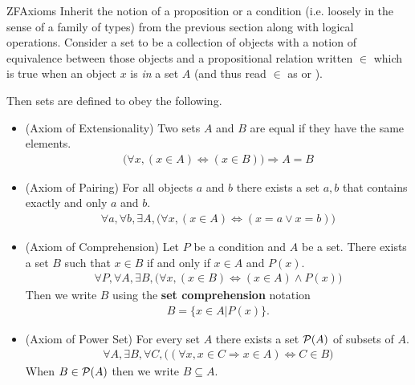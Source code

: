 \documentclass[11pt]{article}
\begin{document}
\begin{label definition}{ZFAxioms}
Inherit the notion of a proposition or a condition (i.e. loosely in the sense of a family of types) from the previous section along with logical operations. Consider a set to be a collection of objects with a notion of equivalence between those objects and a propositional relation written $\in$ which is true when an object $x$ is \emph{in} a set $A$ (and thus read $\in$ as  or ).

Then sets are defined to obey the following. \begin{itemize}

\item (Axiom of Extensionality) Two sets $A$ and $B$ are equal if they have the same elements. \begin{gather*}
\big(\forall x, (x \in A) \Leftrightarrow (x \in B) \big) \Rightarrow A = B
\end{gather*}

\item (Axiom of Pairing) For all objects $a$ and $b$ there exists a set ${a,b}$ that contains exactly and only $a$ and $b$. \begin{gather*}
\forall a, \forall b, \exists A, \big( \forall x, (x \in A) \Leftrightarrow (x = a \vee x = b) \big)
\end{gather*}

\item (Axiom of Comprehension) Let $P$ be a condition and $A$ be a set. There exists a set $B$ such that $x \in B$ if and only if $x \in A$ and $P(x)$. \begin{gather*}
\forall P,\forall A, \exists B, \big(\forall x, (x \in B) \Leftrightarrow (x \in A) \wedge P(x) \big)
\end{gather*}
Then we write $B$ using the \textbf{set comprehension} notation \begin{gather*}
B = \{x \in A | P(x)\}.
\end{gather*}

\item (Axiom of Power Set) For every set $A$ there exists a set $\mathcal{P}(A)$ of subsets of $A$. \begin{gather*}
\forall A, \exists B, \forall C, \big( (\forall x, x\in C \Rightarrow x \in A) \Leftrightarrow C \in B \big)
\end{gather*}
When $B \in \mathcal{P}(A)$ then we write $B \subseteq A$.


\end{itemize}
\end{label definition}
\end{document}
